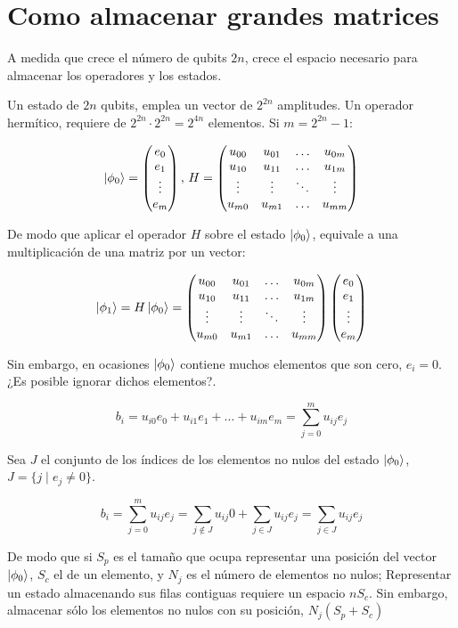 \documentclass{article}
\newcommand*\mat[1]{ \begin{pmatrix} #1 \end{pmatrix}}
\theoremstyle{definition}
\begin{document}
\section{Como almacenar grandes matrices}
A medida que crece el número de qubits $2n$, crece el espacio necesario para 
almacenar los operadores y los estados.

Un estado de $2n$ qubits, emplea un vector de $2^{2n}$ amplitudes. Un operador 
hermítico, requiere de $2^{2n} \cdot 2^{2n} = 2^{4n}$ elementos. Si $m = 
2^{2n}-1$:

$$ \ket{\phi_0} = \mat{e_0 \\ e_1 \\ \vdots \\ e_m},\, H =
	\mat{ u_{00} & u_{01} & \ldots & u_{0m} \\
		u_{10} & u_{11} & \ldots & u_{1m}\\
		\vdots & \vdots & \ddots & \vdots \\
		u_{m0} & u_{m1} & \ldots & u_{mm}\\
	}
$$

De modo que aplicar el operador $H$ sobre el estado $\ket{\phi_0}$, equivale a 
una multiplicación de una matriz por un vector:

$$ \ket{\phi_1} =
	H \ket{\phi_0} = \mat{ u_{00} & u_{01} & \ldots & u_{0m} \\
		u_{10} & u_{11} & \ldots & u_{1m}\\
		\vdots & \vdots & \ddots & \vdots \\
		u_{m0} & u_{m1} & \ldots & u_{mm}\\
	}
	\mat{e_0 \\ e_1 \\ \vdots \\ e_m}
$$

Sin embargo, en ocasiones $\ket{\phi_0}$ contiene muchos elementos que son cero, 
$e_i = 0$. ¿Es posible ignorar dichos elementos?.

$$ b_i = u_{i0} e_0 + u_{i1} e_1 + \ldots + u_{im} e_m =
	\sum_{j = 0}^{m} u_{ij} e_j
$$

Sea $J$ el conjunto de los índices de los elementos no nulos del estado 
$\ket{\phi_0}$, $ J = \{j \mid e_j \neq 0\} $.

$$ b_i = \sum_{j = 0}^{m} u_{ij} e_j =
	\sum_{j \notin J} u_{ij} 0 + \sum_{j \in J} u_{ij} e_j =
	\sum_{j \in J} u_{ij} e_j
$$

De modo que si $S_p$ es el tamaño que ocupa representar una posición del vector 
$\ket{\phi_0}$, $S_c$ el de un elemento, y $N_j$ es el número de elementos no 
nulos; Representar un estado almacenando sus filas contiguas requiere un espacio 
$nS_c$. Sin embargo, almacenar sólo los elementos no nulos con su posición, 
$N_j(S_p + S_c)$
\end{document}
